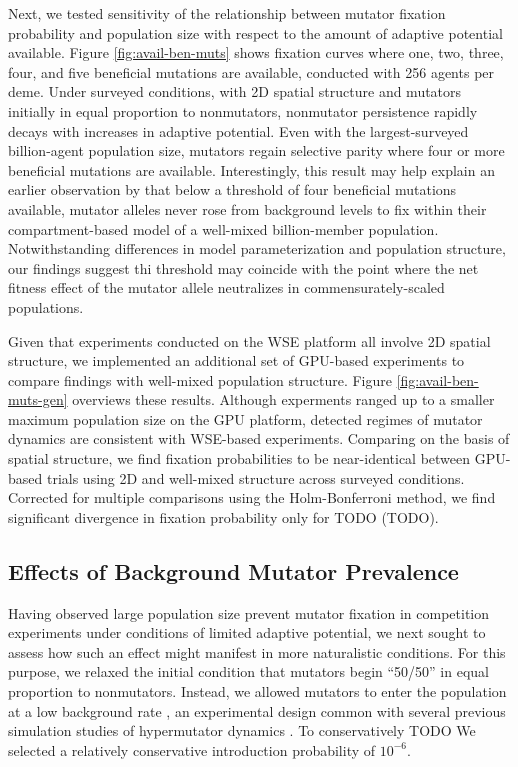 Next, we tested sensitivity of the relationship between mutator fixation probability and population size with respect to the amount of adaptive potential available.
Figure \ref{fig:avail-ben-muts} shows fixation curves where one, two, three, four, and five beneficial mutations are available, conducted with 256 agents per deme.
Under surveyed conditions, with 2D spatial structure and mutators initially in equal proportion to nonmutators, nonmutator persistence rapidly decays with increases in adaptive potential.
Even with the largest-surveyed billion-agent population size, mutators regain selective parity where four or more beneficial mutations are available.
Interestingly, this result may help explain an earlier observation by \citet{tenaillon1999mutators} that below a threshold of four beneficial mutations available, mutator alleles never rose from background levels to fix within their compartment-based model of a well-mixed billion-member population.
Notwithstanding differences in model parameterization and population structure, our findings suggest thi threshold may coincide with the point where the net fitness effect of the mutator allele neutralizes in commensurately-scaled populations.



Given that experiments conducted on the WSE platform all involve 2D spatial structure, we implemented an additional set of GPU-based experiments to compare findings with well-mixed population structure.
Figure \ref{fig:avail-ben-muts-gen} overviews these results.
Although experments ranged up to a smaller maximum population size on the GPU platform, detected regimes of mutator dynamics are consistent with WSE-based experiments.
Comparing on the basis of spatial structure, we find fixation probabilities to be near-identical between GPU-based trials using 2D and well-mixed structure across surveyed conditions.
Corrected for multiple comparisons using the Holm-Bonferroni method, we find significant divergence in fixation probability only for TODO (TODO).

\subsection{Effects of Background Mutator Prevalence}
\label{sec:background-hypermutator-prevalence}



Having observed large population size prevent mutator fixation in competition experiments under conditions of limited adaptive potential, we next sought to assess how such an effect might manifest in more naturalistic conditions.
For this purpose, we relaxed the initial condition that mutators begin ``50/50'' in equal proportion to nonmutators.
Instead, we allowed mutators to enter the population at a low background rate \citep{desai2011balance,johnson1999approach}, an experimental design common with several previous simulation studies of hypermutator dynamics \citep{wylie2009fixation,tenaillon1999mutators}.
To conservatively TODO
We selected a relatively conservative introduction probability of $10^{-6}$.

